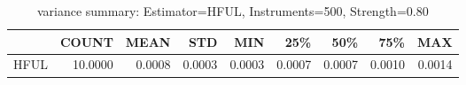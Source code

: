 \begin{table}[ht]
\centering
\caption{variance summary: Estimator=HFUL, Instruments=500, Strength=0.80}
\begin{tabular}{lrrrrrrrr}
\toprule
 & COUNT & MEAN & STD & MIN & 25\% & 50\% & 75\% & MAX \\
\midrule
HFUL & 10.0000 & 0.0008 & 0.0003 & 0.0003 & 0.0007 & 0.0007 & 0.0010 & 0.0014 \\
\bottomrule
\end{tabular}
\end{table}
